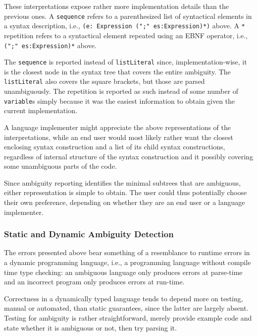 \documentclass{kththesis}
\begin{document}
These interpretations expose rather more implementation details than the previous ones. A \texttt{sequence} refers to a parenthesized list of syntactical elements in a syntax description, i.e., \texttt{(e: Expression (";" es:Expression)*)} above. A \texttt{*} repetition refers to a syntactical element repeated using an EBNF operator, i.e., \texttt{(";" es:Expression)*} above.

The \texttt{sequence} is reported instead of \texttt{listLiteral} since, implementation-wise, it is the closest node in the syntax tree that covers the entire ambiguity. The \texttt{listLiteral} also covers the square brackets, but those are parsed unambiguously. The repetition is reported as such instead of some number of \texttt{variable}s simply because it was the easiest information to obtain given the current implementation.

A language implementer might appreciate the above representations of the interpretations, while an end user would most likely rather want the closest enclosing syntax construction and a list of its child syntax constructions, regardless of internal structure of the syntax construction and it possibly covering some unambiguous parts of the code.

Since ambiguity reporting identifies the minimal subtrees that are ambiguous, either representation is simple to obtain. The user could thus potentially choose their own preference, depending on whether they are an end user or a language implementer.

\subsubsection{Static and Dynamic Ambiguity Detection} \label{sec:static-dynamic-ambiguity}

The errors presented above bear something of a resemblance  to runtime errors in a dynamic programming language, i.e., a programming language without compile time type checking: an ambiguous language only produces errors at parse-time and an incorrect program only produces errors at run-time.

Correctness in a dynamically typed language tends to depend more on testing, manual or automated, than static guarantees, since the latter are largely absent. Testing for ambiguity is rather straightforward, merely provide example code and state whether it is ambiguous or not, then try parsing it.
\end{document}
